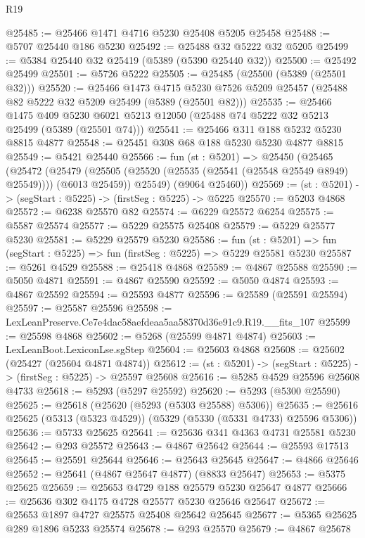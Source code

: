 \begin{lexlean}{R19}
\begin{coremodule}
@25485 := @25466 @1471 @4716 @5230 @25408 @5205 @25458
@25488 := @5707 @25440 @186 @5230
@25492 := @25488 @32 @5222 @32 @5205
@25499 := @5384 @25440 @32 @25419 (@5389 (@5390 @25440 @32))
@25500 := @25492 @25499
@25501 := @5726 @5222
@25505 := @25485 (@25500 (@5389 (@25501 @32)))
@25520 := @25466
    @1473
    @4715
    @5230
    @7526
    @5209
    @25457
    (@25488 @82 @5222 @32 @5209 @25499 (@5389 (@25501 @82)))
@25535 := @25466
    @1475
    @409
    @5230
    @6021
    @5213
    @12050
    (@25488 @74 @5222 @32 @5213 @25499 (@5389 (@25501 @74)))
@25541 := @25466 @311 @188 @5232 @5230 @8815 @4877
@25548 := @25451 @308 @68 @188 @5230 @5230 @4877 @8815
@25549 := @5421 @25440
@25566 := fun (st : @5201) =>
  @25450
    (@25465
      (@25472
        (@25479 (@25505 (@25520 (@25535 (@25541 (@25548 @25549 @8949) @25549)))) (@6013 @25459))
        @25549)
      (@9064 @25460))
@25569 := (st : @5201) -> (segStart : @5225) -> (firstSeg : @5225) -> @5225
@25570 := @5203 @4868
@25572 := @6238 @25570 @82
@25574 := @6229 @25572 @6254
@25575 := @5587 @25574
@25577 := @5229 @25575 @25408
@25579 := @5229 @25577 @5230
@25581 := @5229 @25579 @5230
@25586 := fun (st : @5201) => fun (segStart : @5225) => fun (firstSeg : @5225) => @5229 @25581 @5230
@25587 := @5261 @4529
@25588 := @25418 @4868
@25589 := @4867 @25588
@25590 := @5050 @4871
@25591 := @4867 @25590
@25592 := @5050 @4874
@25593 := @4867 @25592
@25594 := @25593 @4877
@25596 := @25589 (@25591 @25594)
@25597 := @25587 @25596
@25598 := LexLeanPreserve.Ce7e4dac58aefdeaa5aa58370d36e91c9.R19.__fits_107
@25599 := @25598 @4868
@25602 := @5268 (@25599 @4871 @4874)
@25603 := LexLeanBoot.LexiconLse.sgStep
@25604 := @25603 @4868
@25608 := @25602 (@25427 (@25604 @4871 @4874))
@25612 := (st : @5201) -> (segStart : @5225) -> (firstSeg : @5225) -> @25597 @25608
@25616 := @5285 @4529 @25596 @25608 @4733
@25618 := @5293 (@5297 @25592)
@25620 := @5293 (@5300 @25590)
@25625 := @25618 (@25620 (@5293 (@5303 @25588) @5306))
@25635 := @25616 @25625 (@5313 (@5323 @4529)) (@5329 (@5330 (@5331 @4733) @25596 @5306))
@25636 := @5733 @25625
@25641 := @25636 @341 @4363 @4731 @25581 @5230
@25642 := @293 @25572
@25643 := @4867 @25642
@25644 := @25593 @17513
@25645 := @25591 @25644
@25646 := @25643 @25645
@25647 := @4866 @25646
@25652 := @25641 (@4867 @25647 @4877) (@8833 @25647)
@25653 := @5375 @25625
@25659 := @25653 @4729 @188 @25579 @5230 @25647 @4877
@25666 := @25636 @302 @4175 @4728 @25577 @5230 @25646 @25647
@25672 := @25653 @1897 @4727 @25575 @25408 @25642 @25645
@25677 := @5365 @25625 @289 @1896 @5233 @25574
@25678 := @293 @25570
@25679 := @4867 @25678

\end{coremodule}
\end{lexlean}
